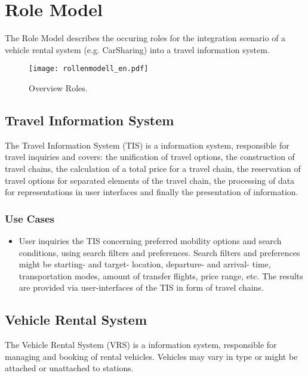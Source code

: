 \chapter{Role Model}
\label{cha:Rollenmodell}

The Role Model describes the occuring roles for the integration scenario of a vehicle rental system (e.g. CarSharing) into a travel information system.

\begin{figure*}[ht]
\centering
\texttt{[image: rollenmodell\_en.pdf]}
\caption{Overview Roles.\label{fig:Rollenmodell}}
\end{figure*}

\section*{Travel Information System}
\label{sec:Rollenmodell:RIS}
The Travel Information System (TIS) is a information system, responsible for travel inquiries and covers: the unification of travel options, the construction of travel chains, the calculation of a total price for a travel chain, the reservation of travel options for separated elements of the travel chain, the processing of data for representations in user interfaces and finally the presentation of information.

\subsection*{Use Cases}
\begin{itemize}
\item User inquiries the TIS concerning preferred mobility options and search conditions, using search filters and preferences. Search filters and preferences might be starting- and target- location, departure- and arrival- time, transportation modes, amount of transfer flights, price range, etc. The results are provided via user-interfaces of the TIS in form of travel chains. 
\end{itemize}

\section*{Vehicle Rental System}
\label{sec:Rollenmodell:FVS}
The Vehicle Rental System (VRS) is a information system, responsible for managing and booking of rental vehicles. Vehicles may vary in type or might be attached or unattached to stations.

